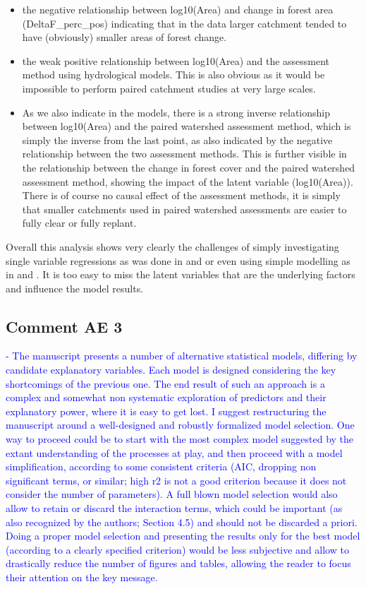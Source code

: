 \documentclass[]{elsarticle} %
\providecommand{\tightlist}{%
  \setlength{\itemsep}{0pt}\setlength{\parskip}{0pt}}
\begin{document}
\begin{itemize}
\tightlist
\item
  the negative relationship between log10(Area) and change in forest area (DeltaF\_perc\_pos) indicating that in the data larger catchment tended to have (obviously) smaller areas of forest change.
\item
  the weak positive relationship between log10(Area) and the assessment method using hydrological models. This is also obvious as it would be impossible to perform paired catchment studies at very large scales.
\item
  As we also indicate in the models, there is a strong inverse relationship between log10(Area) and the paired watershed assessment method, which is simply the inverse from the last point, as also indicated by the negative relationship between the two assessment methods. This is further visible in the relationship between the change in forest cover and the paired watershed assessment method, showing the impact of the latent variable (log10(Area)). There is of course no causal effect of the assessment methods, it is simply that smaller catchments used in paired watershed assessments are easier to fully clear or fully replant.
\end{itemize}

Overall this analysis shows very clearly the challenges of simply investigating single variable regressions as was done in \citet{zhang2017} and \citet{filoso2017} or even using simple modelling as in \citet{jackson2005} and \citet{zhou2015}. It is too easy to miss the latent variables that are the underlying factors and influence the model results.

\hypertarget{comment-ae-3}{%
\subsection{Comment AE 3}\label{comment-ae-3}}

\textcolor{blue}{- The manuscript presents a number of alternative statistical models, differing by candidate explanatory variables. Each model is designed considering the key shortcomings of the previous one. The end result of such an approach is a complex and somewhat non systematic exploration of predictors and their explanatory power, where it is easy to get lost. I suggest restructuring the manuscript around a well-designed and robustly formalized model selection. One way to proceed could be to start with the most complex model suggested by the extant understanding of the processes at play, and then proceed with a model simplification, according to some consistent criteria (AIC, dropping non significant terms, or similar; high r2 is not a good criterion because it does not consider the number of parameters). A full blown model selection would also allow to retain or discard the interaction terms, which could be important (as also recognized by the authors; Section 4.5) and should not be discarded a priori. Doing a proper model selection and presenting the results only for the best model (according to a clearly specified criterion) would be less subjective and allow to drastically reduce the number of figures and tables, allowing the reader to focus their attention on the key message.}
\end{document}
